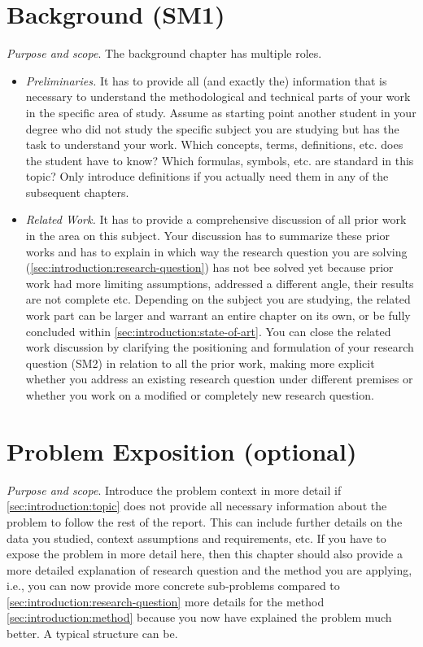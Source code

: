 \documentclass[peerreview,a4paper,english]{IEEEtran}[2015/08/26]
\begin{document}
\section{Background (SM1)}\label{sec:background}
\emph{Purpose and scope}. The background chapter has multiple roles.
\begin{itemize}
    \item \emph{Preliminaries.} It has to provide all (and exactly the) information that is necessary to understand the methodological and technical parts of your work in the specific area of study. Assume as starting point another student in your degree who did not study the specific subject you are studying but has the task to understand your work. Which concepts, terms, definitions, etc. does the student have to know? Which formulas, symbols, etc. are standard in this topic? Only introduce definitions if you actually need them in any of the subsequent chapters.
    \item \emph{Related Work.} It has to provide a comprehensive discussion of all prior work in the area on this subject. Your discussion has to summarize these prior works and has to explain in which way the research question you are solving (\cref{sec:introduction:research-question}) has not bee solved yet because prior work had more limiting assumptions, addressed a different angle, their results are not complete etc. Depending on the subject you are studying, the related work part can be larger and warrant an entire chapter on its own, or be fully concluded within \cref{sec:introduction:state-of-art}.
    You can close the related work discussion by clarifying the positioning and formulation of your research question (SM2) in relation to all the prior work, making more explicit whether you address an existing research question under different premises or whether you work on a modified or completely new research question.
\end{itemize}
\section{Problem Exposition (optional)}\label{sec:problem-exposition}
\emph{Purpose and scope}. Introduce the problem context in more detail if \cref{sec:introduction:topic} does not provide all necessary information about the problem to follow the rest of the report. This can include further details on the data you studied, context assumptions and requirements, etc.
If you have to expose the problem in more detail here, then this chapter should also provide a more detailed explanation of research question and the method you are applying, i.e., you can now provide more concrete sub-problems compared to \cref{sec:introduction:research-question} more details for the method \cref{sec:introduction:method} because you now have explained the problem much better. A typical structure can be.
\end{document}
